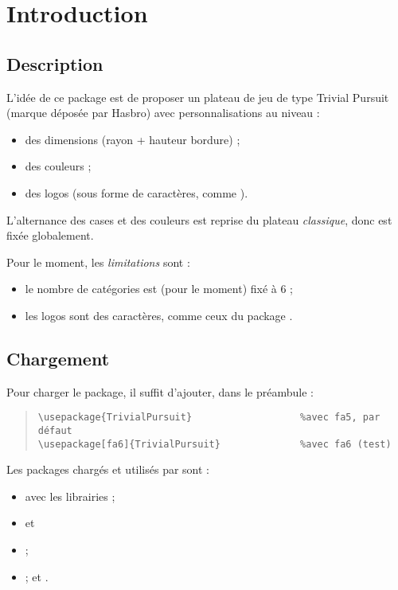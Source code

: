 \documentclass[11pt,a4paper]{ltxdoc}
\begin{document}
\section{Introduction}

\subsection{Description}

L'idée de ce package est de proposer un plateau de jeu de type \textsf{Trivial Pursuit} (marque déposée par Hasbro) avec personnalisations au niveau :

\begin{itemize}
	\item des dimensions (rayon + hauteur bordure) ;
	\item des couleurs ;
	\item des logos (sous forme de caractères, comme ).
\end{itemize}

L'alternance des cases et des couleurs est reprise du plateau \textit{classique}, donc est fixée globalement.

\medskip

Pour le moment, les \textit{limitations} sont :

\begin{itemize}
	\item le nombre de catégories est (pour le moment) fixé à 6 ;
	\item les logos sont des caractères, comme ceux du package .
\end{itemize}

\subsection{Chargement}

Pour charger le package, il suffit d'ajouter, dans le préambule :

\begin{quote}
\begin{verbatim}
\usepackage{TrivialPursuit}                   %avec fa5, par défaut
\usepackage[fa6]{TrivialPursuit}              %avec fa6 (test)
\end{verbatim}
\end{quote}

Les packages chargés et utilisés par  sont :

\begin{itemize}
	\item {} avec les librairies  ;
	\item {} et \item {} ;
	\item {} ;  et .
\end{itemize}
\end{document}
